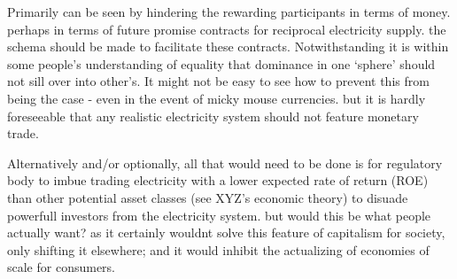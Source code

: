 Primarily can be seen by hindering the rewarding participants in terms of money.
perhaps in terms of future promise contracts for reciprocal electricity supply.
the schema should be made to facilitate these contracts.
Notwithstanding it is within some people's understanding of equality that dominance in one `sphere' should not sill over into other's.
It might not be easy to see how to prevent this from being the case - even in the event of micky mouse currencies.
but it is hardly foreseeable that any realistic electricity system should not feature monetary trade.

Alternatively and/or optionally, all that would need to be done is for regulatory body to imbue trading electricity with a lower expected rate of return (ROE) than other potential asset classes (see XYZ's economic theory) to disuade powerfull investors from the electricity system.
but would this be what people actually want? as it certainly wouldnt solve this feature of capitalism for society, only shifting it elsewhere; and it would inhibit the actualizing of economies of scale for consumers.









